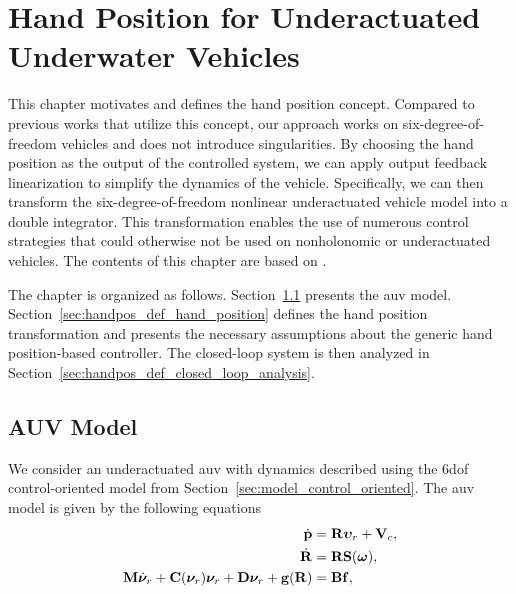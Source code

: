 \chapter{Hand Position for Underactuated Underwater Vehicles}
\label{chap:handpos_definition}

\newcommand{\LBomega}{\Bar{p}}
\newcommand{\LBnu}{\Bar{\bvel}_e}

This chapter motivates and defines the hand position concept.
Compared to previous works that utilize this concept, our approach works on six-degree-of-freedom vehicles and does not introduce singularities.
By choosing the hand position as the output of the controlled system, we can apply output feedback linearization to simplify the dynamics of the vehicle.
Specifically, we can then transform the six-degree-of-freedom nonlinear underactuated vehicle model into a double integrator.
This transformation enables the use of numerous control strategies that could otherwise not be used on nonholonomic or underactuated vehicles.
The contents of this chapter are based on \cite{matous_trajectory_2023}.

The chapter is organized as follows.
Section~\ref{sec:handpos_def_model} presents the \gls{auv} model.
Section~\ref{sec:handpos_def_hand_position} defines the hand position transformation and presents the necessary assumptions about the generic hand position-based controller.
The closed-loop system is then analyzed in Section~\ref{sec:handpos_def_closed_loop_analysis}.

\vspace*{-0.3em}

\section{AUV Model}
\label{sec:handpos_def_model}

\vspace*{-0.3em}

We consider an underactuated \gls{auv} with dynamics described using the 6\gls{dof} control-oriented model from Section~\ref{sec:model_control_oriented}.
The \gls{auv} model is given by the following equations \vspace*{-0.7em}
\begin{subequations}
    \begin{align}
        \dot{\mathbf{p}} &= \mathbf{R}\bm{\upsilon}_r + \mathbf{V}_c, \\
        \dot{\mathbf{R}} &= \mathbf{R}\mathbf{S}(\bm{\omega}), \\
        \mathbf{M}\dot{\bm{\nu}}_r + \mathbf{C}(\bm{\nu}_r)\bm{\nu}_r + \mathbf{D}\bm{\nu}_r + \mathbf{g}(\mathbf{R}) &= \mathbf{B}\mathbf{f}, \label{eq:handpos_def_zeta_dot_matrix}
    \end{align}
\end{subequations}

